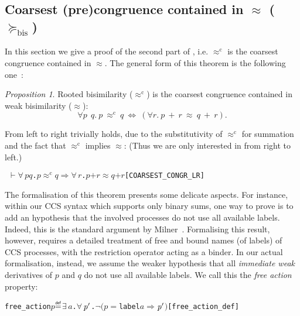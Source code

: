 \documentclass[GCNS]{yincog}
\renewcommand{\HOLConst}[1]{\texttt{#1}}
\renewcommand{\HOLBoundVar}[1]{\ensuremath{\mathit{#1}}}
\renewcommand{\HOLFreeVar}[1]{\ensuremath{\mathit{#1}}}
\renewcommand{\HOLSymConst}[1]{#1}
\renewcommand{\HOLTokenNeg}{\ensuremath{\neg}}
\renewcommand{\HOLTokenDefEquality}{\ensuremath{\mathrel{\overset{\makebox [0pt]{\text{\tiny \textsf{def}}}}{=}}}}
\renewcommand{\HOLTokenExists}{\ensuremath{\exists \,}}
\renewcommand{\HOLTokenForall}{\ensuremath{\forall \,}}
\renewcommand{\HOLTokenTurnstile}{\ensuremath{\:\:\vdash}}
\theoremstyle{remark}
\theoremstyle{theorem}
\newtheorem{proposition}[definition]{Proposition}
\theoremstyle{remark}
\newcommand{\HOLTokenWeakEQ}{$\approx$}
\newcommand{\HOLTokenObsCongr}{$\approx^{\mathrm{c}}\!$}
\newcommand{\HOLTokenWeakTransBegin}{$=$}
\newcommand{\HOLTokenWeakTransEnd}{$\Rightarrow$\xspace}
\renewcommand{\HOLTokenImp}{\ensuremath{\Longrightarrow}}
\newcommand{\rapprox}{\mathrel{\approx^{\mathrm{c}}}}
\newcommand{\wbvtex}{\approx}
\begin{document}
\subsection{Coarsest (pre)congruence contained in $\approx $ ($\succeq _{\mathrm{bis}}$)}
 \label{s:coarsest}

In this section we give a proof of the second part of ,
i.e. $\rapprox $ is the coarsest congruence contained in $\wbvtex $. The
general form of this theorem is the following one~\cite{van2005characterisation,Gorrieri:2015jt,Mil89}:
%
\begin{proposition}
 \label{prop:coarsest}
Rooted bisimilarity ($\rapprox $) is the coarsest congruence contained
in weak bisimilarity ($\wbvtex $):
%
\begin{equation}
 \label{eq:coarsest}
\forall p\ \ q.\ p\ \rapprox \ \! q\ \Longleftrightarrow \ ( \forall r.
\ p\ +\
r\ \approx \ q\ +\ r ).
\end{equation}
%
\end{proposition}
%
From left to right  trivially holds, due to the substitutivity
of $\rapprox $ for summation and the fact that $\rapprox $ implies
$\wbvtex $: (Thus we are only interested in  from right
to left.)
%
\begin{alltt}
\HOLTokenTurnstile{} \HOLSymConst{\HOLTokenForall{}}\HOLBoundVar{p} \HOLBoundVar{q}. \HOLBoundVar{p} \HOLSymConst{\HOLTokenObsCongr} \HOLBoundVar{q} \HOLSymConst{\HOLTokenImp{}} \HOLSymConst{\HOLTokenForall{}}\HOLBoundVar{r}. \HOLBoundVar{p} \HOLSymConst{\ensuremath{+}} \HOLBoundVar{r} \HOLSymConst{\HOLTokenWeakEQ} \HOLBoundVar{q} \HOLSymConst{\ensuremath{+}} \HOLBoundVar{r}\hfill{[COARSEST\_CONGR\_LR]}
\end{alltt}

The formalisation of this theorem presents some delicate aspects. For instance,
within our CCS syntax which supports only binary sums, one way to prove
\reftext{Proposition~\ref{prop:coarsest}} is to add an hypothesis that the involved
processes do not use all available labels. Indeed, this is the standard
argument by Milner~\citep[p.~153]{Mil89}. Formalising this result, however,
requires a detailed treatment of free and bound names (of labels) of CCS
processes, with the restriction operator acting as a binder. In our actual
formalisation, instead, we assume the weaker hypothesis that all
\emph{immediate weak} derivatives of $p$ and $q$ do not use all available
labels. We call this the \emph{free action} property:
%
\begin{alltt}
   \HOLConst{free\_action} \HOLFreeVar{p} \HOLTokenDefEquality{} \HOLSymConst{\HOLTokenExists{}}\HOLBoundVar{a}. \HOLSymConst{\HOLTokenForall{}}\ensuremath{\HOLBoundVar{p}\sp{\prime}}. \HOLSymConst{\HOLTokenNeg{}}\ensuremath{(}\HOLFreeVar{p} \HOLTokenWeakTransBegin\HOLConst{label} \HOLBoundVar{a}\HOLTokenWeakTransEnd \ensuremath{\HOLBoundVar{p}\sp{\prime}}\ensuremath{)}\hfill{[free\_action\_def]}
\end{alltt}
\end{document}
